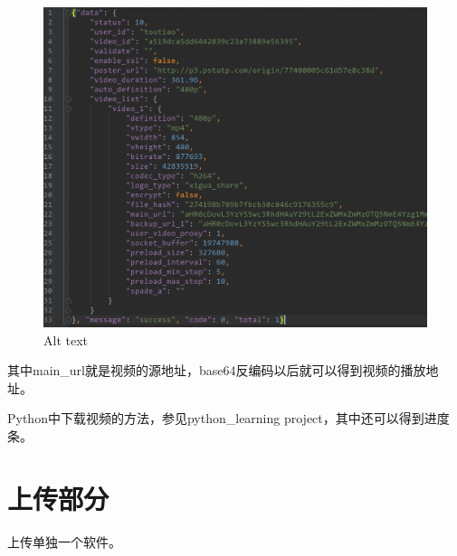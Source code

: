 \documentclass[11pt]{article}
\makeatletter
\def\maxwidth{\ifdim\Gin@nat@width>\linewidth\linewidth
    \else\Gin@nat@width\fi}
\let\Oldincludegraphics\includegraphics
\renewcommand{\includegraphics}[1]{\Oldincludegraphics[width=.8\maxwidth]{#1}}
\makeatother
\begin{document}
\begin{figure}
\centering
\includegraphics{./img/response.png}
\caption{Alt text}
\end{figure}

其中main\_url就是视频的源地址，base64反编码以后就可以得到视频的播放地址。

Python中下载视频的方法，参见python\_learning
project，其中还可以得到进度条。

    \section{上传部分}\label{ux4e0aux4f20ux90e8ux5206}

上传单独一个软件。


    
    
    
    
\end{document}
